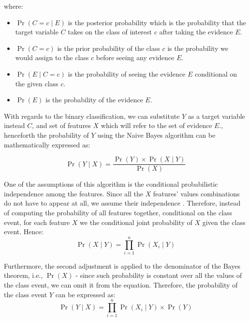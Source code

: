 where:
\begin{itemize}\setlength\itemsep{0em}
	\item $\operatorname{Pr}\left(C=c \mid E \right)$ is the posterior probability which is the probability that the target variable $C$ takes on the class of interest $c$ after taking the evidence $E$.
	\item $\operatorname{Pr}\left(C=c\right)$  is the prior probability of the class $c$ is the probability we would assign to the class $c$ before seeing any evidence $E$.
	\item $\operatorname{Pr}\left(E \mid C=c\right)$ is the probability of seeing the evidence $E$ conditional on the given class $c$.
	\item $\operatorname{Pr}\left(E\right)$ is the probability of the evidence $E$.
\end{itemize}

With regards to the binary classification, we can substitute $Y$ as a target variable instead $C$, and set of features $X$ which will refer to the set of evidence $E$., henceforth the probability of $Y$ using the Naive Bayes algorithm can be mathematically expressed as:

\begin{equation}\label{eq}
    \operatorname{Pr}\left(Y \mid X \right) = \frac{\operatorname{Pr}\left(Y\right) \times \operatorname{Pr}\left(X \mid Y \right)}{\operatorname{Pr}\left(X\right)}
\end{equation}

One of the assumptions of this algorithm is the conditional probabilistic independence among the features.
Since all the $X$ features' values combinations do not have to appear at all, we assume their independence \citep{cichosz2014data}.
Therefore, instead of computing the probability of all features together, conditional on the class event, for each feature $X$ we the conditional joint probability of $X$ given the class event. Hence:
\begin{equation}\label{eq}
    \operatorname{Pr}\left(X  \mid Y \right) = \prod_{i=1}^{n} \operatorname{Pr}\left(X_i \mid Y\right)
\end{equation}

Furthermore, the second adjustment is applied to the denominator of the Bayes theorem, i.e., $\operatorname{Pr}\left(X\right)$ - since such probability is constant over all the values of the class event, we can omit it from the equation. Therefore, the probability of the class event $Y$ can be expressed as:
\begin{equation}\label{eq}
    \operatorname{Pr}\left(Y \mid X \right) = \prod_{i=1}^{n} \operatorname{Pr}\left(X_i \mid Y\right) \times \operatorname{Pr}\left(Y\right)
\end{equation}

